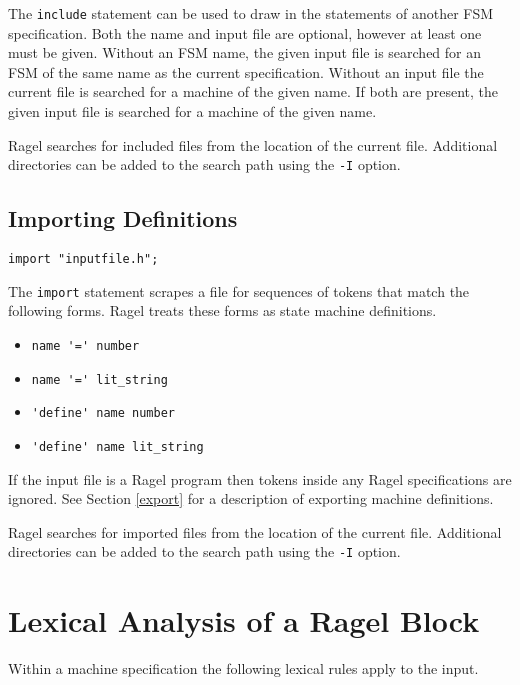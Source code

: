 \documentclass[letterpaper,11pt,oneside]{book}
\newcommand{\verbspace}{\vspace{10pt}}
\begin{document}
The \verb|include| statement can be used to draw in the statements of another FSM
specification. Both the name and input file are optional, however at least one
must be given. Without an FSM name, the given input file is searched for an FSM
of the same name as the current specification. Without an input file the
current file is searched for a machine of the given name. If both are present,
the given input file is searched for a machine of the given name.

Ragel searches for included files from the location of the current file.
Additional directories can be added to the search path using the \verb|-I|
option.

\subsection{Importing Definitions}
\label{import}

\begin{verbatim}
import "inputfile.h";
\end{verbatim}
\verbspace

The \verb|import| statement scrapes a file for sequences of tokens that match
the following forms. Ragel treats these forms as state machine definitions.

\begin{itemize}
    \setlength{\itemsep}{-2mm}
\item \verb|name '=' number|
\item \verb|name '=' lit_string|
\item \verb|'define' name number|
\item \verb|'define' name lit_string|
\end{itemize}

If the input file is a Ragel program then tokens inside any Ragel
specifications are ignored. See Section \ref{export} for a description of
exporting machine definitions.

Ragel searches for imported files from the location of the current file.
Additional directories can be added to the search path using the \verb|-I|
option.

\section{Lexical Analysis of a Ragel Block}
\label{lexing}

Within a machine specification the following lexical rules apply to the input.
\end{document}
